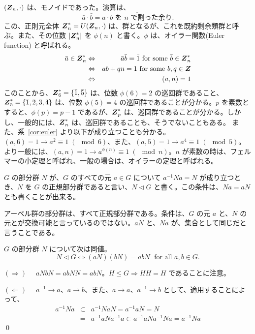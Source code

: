 \begin{eg}
$(\mbox{\boldmath $Z$}_n,\cdot)$ は、モノイドであった。演算は、
$$\bar{a}\cdot\bar{b} = \overline{a\cdot b \mbox{ を $n$ で割った余り}}.$$
この、正則元全体 $\mbox{\boldmath $Z$}^*_n = U(\mbox{\boldmath $Z$}_n,\cdot)$ は、群となるが、これを既約剰余類群と呼ぶ。また、その位数 $|\mbox{\boldmath $Z$}^*_n|$ を $\phi(n)$ と書く。$\phi$ は、オイラー関数(Euler function) と呼ばれる。
\begin{eqnarray*}
\bar{a}\in \mbox{\boldmath $Z$}_n^* & \Leftrightarrow & \bar{a}\bar{b} = \bar{1} \mbox{ for some } \bar{b}\in \mbox{\boldmath $Z$}^*_n\\
& \Leftrightarrow & ab + qn = 1 \mbox{ for some }b,q\in \mbox{\boldmath $Z$}\\
& \Leftrightarrow & (a,n) = 1
\end{eqnarray*}
このことから、$\mbox{\boldmath $Z$}^*_6 = \{\bar{1},\bar{5}\}$ は、位数 $\phi(6) = 2$ の巡回群であること、 $\mbox{\boldmath $Z$}^*_5 = \{\bar{1},\bar{2},\bar{3},\bar{4}\}$ は、位数 $\phi(5) = 4$ の巡回群であることが分かる。$p$ を素数とすると、$\phi(p) = p-1$ であるが、$\mbox{\boldmath $Z$}^*_p$  は、巡回群であることが分かる。しかし、一般的には、$\mbox{\boldmath $Z$}^*_n$ は、巡回群であることも、そうでないこともある。 
また、系~\ref{cor:euler} より以下が成り立つことも分かる。
$(a,6) = 1 \to a^2 \equiv 1 \;(\mod 6)$、また、$(a,5) = 1 \to a^4 \equiv 1 \;(\mod 5)$。
より一般には、$(a,n) = 1\to a^{\phi(n)}\equiv 1 \;(\mod n)$。$n$ が素数の時は、フェルマーの小定理と呼ばれ、一般の場合は、オイラーの定理と呼ばれる。
\end{eg}

\newpage
{}
\begin{definition}
$G$ の部分群 $N$ が、$G$ のすべての元 $a\in G$ について $a^{-1}Na = N$ が成り立つとき、$N$ を $G$ の正規部分群であると言い、$N\lhd G$ と書く。この条件は、$Na = aN$ とも書くことが出来る。
\end{definition}

アーベル群の部分群は、すべて正規部分群である。条件は、$G$ の元 $a$ と、$N$ の元とが交換可能と言っているのではない。$aN$ と、$Na$ が、集合として同じだと言うことである。

\begin{lemma} \label{lemma:factorgp}
$G$ の部分群 $N$ について次は同値。
$$N \lhd G \Leftrightarrow (aN)(bN) = abN \;\mbox{ for all }a,b\in G.$$
\end{lemma}
\proof
$(\Rightarrow)\quad$
$aNbN = abNN = abN$。$H\leq G \Rightarrow HH = H$ であることに注意。

\smallskip
$(\Leftarrow)\quad$
$a^{-1}\to a$、$a\to b$、また、$a \to a$、$a^{-1}\to b$ として、適用することによって、
\begin{eqnarray*}
a^{-1}Na & \subset & a^{-1}NaN = a^{-1}aN = N \\
	& = & a^{-1}aNa^{-1}a \subset a^{-1}aNa^{-1}Na = a^{-1}Na
\end{eqnarray*}
\qed

